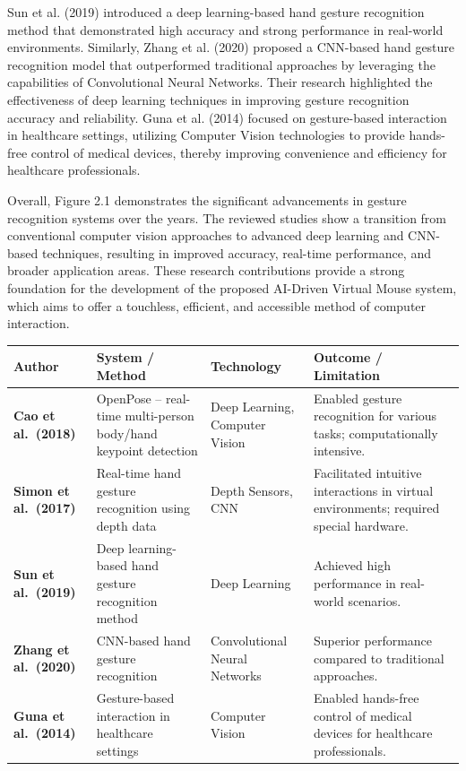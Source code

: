 \documentclass[12pt,a4paper]{report}
\begin{document}
Sun et al. (2019) introduced a deep learning-based hand gesture recognition method that demonstrated high accuracy and strong performance in real-world environments. Similarly, Zhang et al. (2020) proposed a CNN-based hand gesture recognition model that outperformed traditional approaches by leveraging the capabilities of Convolutional Neural Networks. Their research highlighted the effectiveness of deep learning techniques in improving gesture recognition accuracy and reliability. Guna et al. (2014) focused on gesture-based interaction in healthcare settings, utilizing Computer Vision technologies to provide hands-free control of medical devices, thereby improving convenience and efficiency for healthcare professionals.

Overall, Figure 2.1 demonstrates the significant advancements in gesture recognition systems over the years. The reviewed studies show a transition from conventional computer vision approaches to advanced deep learning and CNN-based techniques, resulting in improved accuracy, real-time performance, and broader application areas. These research contributions provide a strong foundation for the development of the proposed AI-Driven Virtual Mouse system, which aims to offer a touchless, efficient, and accessible method of computer interaction.

\begin{table}[ht]
\centering
\caption{Summary of Related Work}
\label{tab:litsurvey}
\begin{longtable}{|p{2.6cm}|p{3.6cm}|p{2.6cm}|p{4.2cm}|}
\hline
\textbf{Author} & \textbf{System / Method} & \textbf{Technology} & \textbf{Outcome / Limitation} \\
\hline
\textbf{Cao et al.\ (2018)}
& OpenPose -- real-time multi-person body/hand keypoint detection
& Deep Learning, Computer Vision
& Enabled gesture recognition for various tasks; computationally intensive. \\
\hline
\textbf{Simon et al.\ (2017)}
& Real-time hand gesture recognition using depth data
& Depth Sensors, CNN
& Facilitated intuitive interactions in virtual environments; required special hardware. \\
\hline
\textbf{Sun et al.\ (2019)}
& Deep learning-based hand gesture recognition method
& Deep Learning
& Achieved high performance in real-world scenarios. \\
\hline
\textbf{Zhang et al.\ (2020)}
& CNN-based hand gesture recognition
& Convolutional Neural Networks
& Superior performance compared to traditional approaches. \\
\hline
\textbf{Guna et al.\ (2014)}
& Gesture-based interaction in healthcare settings
& Computer Vision
& Enabled hands-free control of medical devices for healthcare professionals. \\
\hline

\end{longtable}
\end{table}
\end{document}
